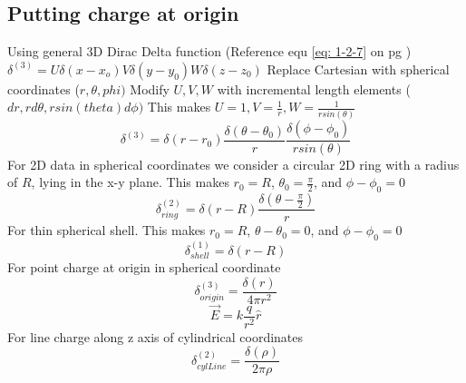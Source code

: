 \documentclass[12pt]{article}
\begin{document}
\subsection{Putting charge at origin} \label{subsection3-1}
    Using general 3D Dirac Delta function (Reference equ \ref{eq: 1-2-7} on pg \pageref{eq: 1-2-7})
    \newline $\delta^{(3)}=U \delta(x-x_o) V \delta(y-y_0) W \delta(z-z_0)$
    \newline Replace Cartesian with spherical coordinates ($r, \theta, phi)$ 
    \newline Modify $U,V,W$ with incremental length elements ($dr, rd\theta, r sin(theta) d\phi)$
    \newline This makes $U = 1, V = \frac{1}{r}, W = \frac{1}{r sin(\theta)}$
    \begin{equation} \label{eq: 3-1-1}
        \delta^{(3)} = \delta(r-r_0) \frac{\delta (\theta - \theta_0)}{r} \frac{\delta (\phi - \phi_0)}{r sin(\theta)}
    \end{equation}
    \newline For 2D data in spherical coordinates we consider a circular 2D ring with a radius of $R$, lying in the x-y plane. This makes $r_0 = R$, $\theta_0 = \frac{\pi}{2}$, and $\phi-\phi_0 = 0$
    \begin{equation} \label{eq: 3-1-2}
        \delta^{(2)}_{ring} = \delta(r-R) \frac{\delta(\theta - \frac{\pi}{2})}{r}
    \end{equation}
    \newline For thin spherical shell. This makes $r_0 = R$, $\theta - \theta_0 = 0$, and $\phi-\phi_0 = 0$
    \begin{equation} \label{eq: 3-1-3}
        \delta^{(1)}_{shell} = \delta(r-R)
    \end{equation}
    \newline For point charge at origin in spherical coordinate
    \begin{equation} \label{eq: 3-1-4}
        \delta^{(3)}_{origin} = \frac{\delta(r)}{4 \pi r^2}
    \end{equation}
    \begin{equation} \label{eq: 3-1-5}
        \vec{E} = k \frac{q}{r^{2}} \hat{r}
    \end{equation}
    \newline For line charge along z axis of cylindrical coordinates
    \begin{equation} \label{eq: 3-1-6}
        \delta^{(2)}_{cylLine} = \frac{\delta(\rho)}{2 \pi \rho}
    \end{equation}
\end{document}
